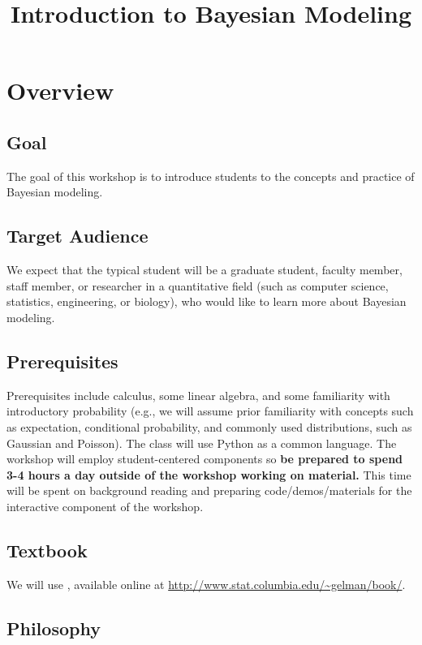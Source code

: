\documentclass{article} %
\begin{document}
\title{Introduction to Bayesian Modeling} 

\maketitle
\tableofcontents

\section{Overview}

\subsection{Goal}  The goal of this workshop is to introduce students to the concepts and practice of Bayesian modeling.  

\subsection{Target Audience}  We expect that the typical student will be a graduate student, faculty member, staff member, or researcher in a quantitative field (such as computer science,  statistics,  engineering, or biology),  who would like to learn more about Bayesian modeling.  

\subsection{Prerequisites} Prerequisites include calculus,  some linear algebra, and some familiarity with introductory probability (e.g.,  we will assume prior familiarity with concepts such as expectation,  conditional probability,  and commonly used distributions,  such as Gaussian and Poisson).    The class will use Python as a common language.    The workshop will employ student-centered components so \textbf{be prepared to spend 3-4 hours a day outside of the workshop working on material.}  This time will be spent on  background reading and preparing code/demos/materials for the interactive component of the workshop.

\subsection{Textbook}

We will use \cite{gelman2013bayesian},  available online at \url{http://www.stat.columbia.edu/~gelman/book/}. 

\subsection{Philosophy}
\end{document}
